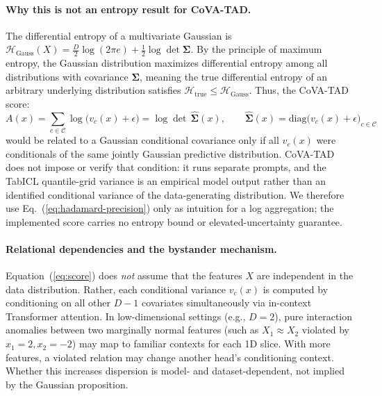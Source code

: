 \documentclass{article}
\begin{document}
\paragraph{Why this is not an entropy result for CoVA-TAD.}
The differential entropy of a multivariate Gaussian is $\mathcal{H}_{\text{Gauss}}(X) = \frac{D}{2}\log(2\pi e) + \frac{1}{2}\log\det\boldsymbol{\Sigma}$. By the principle of maximum entropy, the Gaussian distribution maximizes differential entropy among all distributions with covariance $\boldsymbol{\Sigma}$, meaning the true differential entropy of an arbitrary underlying distribution satisfies $\mathcal{H}_{\text{true}} \leq \mathcal{H}_{\text{Gauss}}$. Thus, the CoVA-TAD score:
\begin{equation}
  A(x) = \sum_{c \in \mathcal{C}} \log\bigl(v_c(x) + \epsilon\bigr) = \log\det\,\widehat{\boldsymbol{\Sigma}}(x), \qquad \widehat{\boldsymbol{\Sigma}}(x) = \mathrm{diag}\bigl(v_c(x) + \epsilon\bigr)_{c \in \mathcal{C}}
\end{equation}
would be related to a Gaussian conditional covariance only if all $v_c(x)$ were conditionals of the same jointly Gaussian predictive distribution. CoVA-TAD does not impose or verify that condition: it runs separate prompts, and the TabICL quantile-grid variance is an empirical model output rather than an identified conditional variance of the data-generating distribution. We therefore use Eq.~(\ref{eq:hadamard-precision}) only as intuition for a log aggregation; the implemented score carries no entropy bound or elevated-uncertainty guarantee.

\paragraph{Relational dependencies and the bystander mechanism.}
Equation~(\ref{eq:score}) does \emph{not} assume that the features $X$ are independent in the data distribution. Rather, each conditional variance $v_c(x)$ is computed by conditioning on all other $D-1$ covariates simultaneously via in-context Transformer attention. 
In low-dimensional settings (e.g., $D=2$), pure interaction anomalies between two marginally normal features (such as $X_1 \approx X_2$ violated by $x_1=2, x_2=-2$) may map to familiar contexts for each 1D slice. With more features, a violated relation may change another head's conditioning context. Whether this increases dispersion is model- and dataset-dependent, not implied by the Gaussian proposition.

\end{document}
